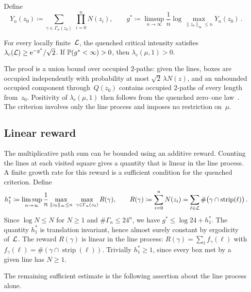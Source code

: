 \documentclass[11pt,letterpaper]{article}
\begin{document}
Define
\begin{equation*}
  Y_n(z_0)\coloneqq\sum_{\gamma\in\Gamma_n(z_0)}\ \prod_{i=0}^nN(z_i),\qquad g^*\coloneqq\limsup_{n\to\infty}\frac1n\log\max_{\lVert z_0\rVert_\infty\le n}Y_n(z_0)\,.
\end{equation*}

\begin{theorem}
\label{thm:criterion}
For every locally finite~$\cL$, the quenched critical intensity satisfies $\lambda_c(\cL)\ge\e^{-g^*}/\sqrt2$. If $\P(g^*<\infty)>0$, then $\lambda_c(\mu,1)>0$.
\end{theorem}

The proof is a union bound over occupied $2$-paths: given the lines, boxes are occupied independently with probability at most $\sqrt2\,\lambda N(z)$, and an unbounded occupied component through~$Q(z_0)$ contains occupied $2$-paths of every length from~$z_0$. Positivity of $\lambda_c(\mu,1)$ then follows from the quenched zero--one law~\cite[Proposition~3.3]{HJ26b}. The criterion involves only the line process and imposes no restriction on~$\mu$.

\subsection{Linear reward}

The multiplicative path sum can be bounded using an additive reward. Counting the lines at each visited square gives a quantity that is linear in the line process. A finite growth rate for this reward is a sufficient condition for the quenched criterion. Define
\begin{equation}
\label{eq:h1}
  h_1^*\coloneqq\limsup_{n\to\infty}\frac1n\max_{\lVert z_0\rVert_\infty\le n}\ \max_{\gamma\in\Gamma_n(z_0)}R(\gamma),\qquad
  R(\gamma)\coloneqq\sum_{i=0}^nN(z_i)=\sum_{\ell\in\cL}\#\bigl(\gamma\cap\operatorname{strip}(\ell)\bigr)\,.
\end{equation}
Since $\log N\le N$ for $N\ge1$ and $\#\Gamma_n\le24^n$, we have $g^*\le\log24+h_1^*$. The quantity $h_1^*$ is translation invariant, hence almost surely constant by ergodicity of~$\cL$. The reward $R(\gamma)$ is linear in the line process: $R(\gamma)=\sum_\ell f_\gamma(\ell)$ with $f_\gamma(\ell)=\#(\gamma\cap\operatorname{strip}(\ell))$. Trivially $h_1^*\ge1$, since every box met by a given line has $N\ge1$.

The remaining sufficient estimate is the following assertion about the line process alone.
\end{document}

